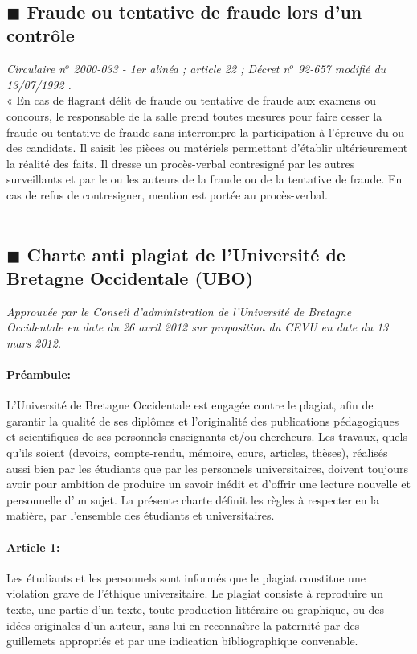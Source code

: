 \documentclass[11pt]{article}
\newcommand{\mysubsection}[1]
{~\\
{\noindent
\begin{minipage}{\linewidth}
\subsection*{$\blacksquare$ #1}
\end{minipage}
}
}
\begin{document}
\begin{multicols*}{2}
\mysubsection{Fraude ou tentative de fraude lors d'un contrôle}

\textit{Circulaire n$^{o}$ 2000-033 - 1er alinéa ; article 22 ; Décret n$^{o}$ 92-657 modifié du 13/07/1992 .}\\

« En cas de flagrant délit de fraude ou tentative de fraude aux examens ou concours, le responsable de la salle prend toutes mesures pour faire cesser la fraude ou tentative de fraude sans interrompre la participation à l'épreuve du ou des candidats. Il saisit les pièces ou matériels permettant d'établir ultérieurement la réalité des faits. Il dresse un procès-verbal contresigné par les autres surveillants et par le ou les auteurs de la fraude ou de la tentative de fraude. En cas de refus de contresigner, mention est portée au procès-verbal.\\

\mysubsection{Charte anti plagiat de l'Université de Bretagne Occidentale (UBO)}

\textit{Approuvée par le Conseil d'administration de l'Université de Bretagne
Occidentale en date du 26 avril 2012 sur proposition du CEVU en date
du 13 mars 2012.}\\

\paragraph{Préambule: } L'Université de Bretagne Occidentale est engagée contre le plagiat, afin de garantir la qualité de ses diplômes et l'originalité des publications pédagogiques et scientifiques de ses personnels enseignants et/ou chercheurs. Les travaux, quels qu'ils soient (devoirs, compte-rendu, mémoire, cours, articles, thèses), réalisés aussi bien par les étudiants que par les personnels universitaires, doivent toujours avoir pour ambition de produire un savoir inédit et d'offrir une lecture nouvelle et personnelle d'un sujet. La présente charte définit les règles à respecter en la matière, par l'ensemble des étudiants et universitaires.

\paragraph{Article 1: } Les étudiants et les personnels sont informés que le plagiat constitue une
violation grave de l'éthique universitaire. Le plagiat consiste à reproduire
un texte, une partie d'un texte, toute production littéraire ou graphique, ou
des idées originales d'un auteur, sans lui en reconnaître la paternité par des
guillemets appropriés et par une indication bibliographique convenable.


\end{multicols*}
\end{document}
